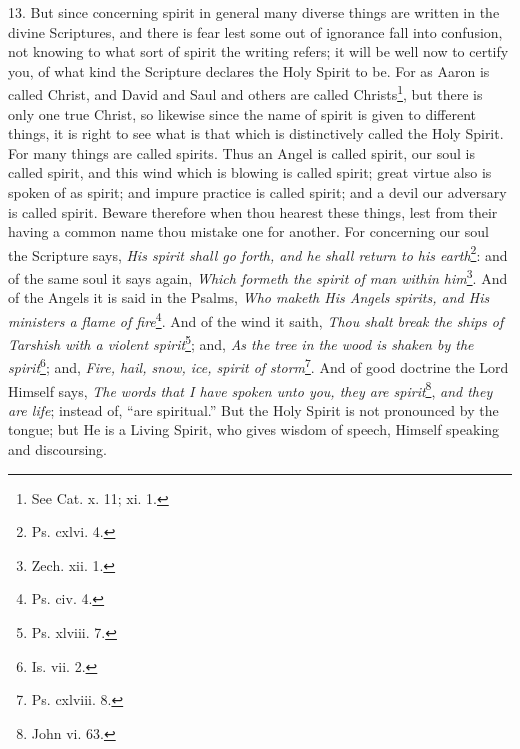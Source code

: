 13. But since concerning spirit in general many diverse things are written in the divine Scriptures, and there is fear lest some out of ignorance fall into confusion, not knowing to what sort of spirit the writing refers; it will be well now to certify you, of what kind the Scripture declares the Holy Spirit to be. For as Aaron is called Christ, and David and Saul and others are called Christs\footnote{See Cat. x. 11; xi. 1.}, but there is only one true Christ, so likewise since the name of spirit is given to different things, it is right to see what is that which is distinctively called the Holy Spirit. For many things are called spirits. Thus an Angel is called spirit, our soul is called spirit, and this wind which is blowing is called spirit; great virtue also is spoken of as spirit; and impure practice is called spirit; and a devil our adversary is called spirit. Beware therefore when thou hearest these things, lest from their having a common name thou mistake one for another. For concerning our soul the Scripture says, \emph{His spirit shall go forth, and he shall return to his earth}\footnote{Ps. cxlvi. 4.}: and of the same soul it says again, \emph{Which formeth the spirit of man within him}\footnote{Zech. xii. 1.}. And of the Angels it is said in the Psalms, \emph{Who maketh His Angels spirits, and His ministers a flame of fire}\footnote{Ps. civ. 4.}. And of the wind it saith, \emph{Thou shalt break the ships of Tarshish with a violent spirit}\footnote{Ps. xlviii. 7.}; and, \emph{As the tree in the wood is shaken by the spirit}\footnote{Is. vii. 2.}; and, \emph{Fire, hail, snow, ice, spirit of storm}\footnote{Ps. cxlviii. 8.}. And of good doctrine the Lord Himself says, \emph{The words that I have spoken unto you, they are spirit}\footnote{John vi. 63.}, \emph{and they are life}; instead of, “are spiritual.” But the Holy Spirit is not pronounced by the tongue; but He is a Living Spirit, who gives wisdom of speech, Himself speaking and discoursing.

